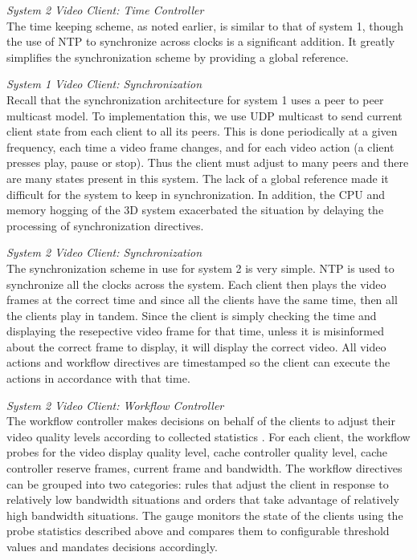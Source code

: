 \documentclass[10pt]{article}
\begin{document}
\textit{System 2 Video Client: Time Controller}  \\
The time keeping scheme, as noted earlier, is similar to that of
system 1, though the use of NTP to synchronize across clocks is a
significant addition.  It greatly simplifies the synchronization
scheme by providing a global reference.

\textit{System 1 Video Client: Synchronization}  \\
Recall that the synchronization architecture for system 1 uses a peer
to peer multicast model.  To implementation this, we use UDP multicast
to send current client state from each client to all its peers.  This
is done periodically at a given frequency, each time a video frame
changes, and for each video action (a client presses play, pause or
stop).  Thus the client must adjust to many peers and there are many
states present in this system.  The lack of a global reference made it
difficult for the system to keep in synchronization.  In addition, the
CPU and memory hogging of the 3D system exacerbated the situation
by delaying the processing of synchronization directives.

\textit{System 2 Video Client: Synchronization}  \\
The synchronization scheme in use for system 2 is very simple.  NTP is
used to synchronize all the clocks across the system.  Each client
then plays the video frames at the correct time and since all the
clients have the same time, then all the clients play in tandem.
Since the client is simply checking the time and displaying the
resepective video frame for that time, unless it is misinformed about
the correct frame to display, it will display the correct video.  All
video actions and workflow directives are timestamped so the client
can execute the actions in accordance with that time.  

\textit{System 2 Video Client: Workflow Controller}  \\
The workflow controller makes decisions on behalf of the clients to
adjust their video quality levels according to collected statistics .
For each client, the workflow probes for the video display quality
level, cache controller quality level, cache controller reserve
frames, current frame and bandwidth.  The workflow directives can be
grouped into two categories: rules that adjust the client in response
to relatively low bandwidth situations and orders that take advantage
of relatively high bandwidth situations.  The gauge monitors the state
of the clients using the probe statistics described above and compares
them to configurable threshold values and mandates decisions
accordingly.
\end{document}
